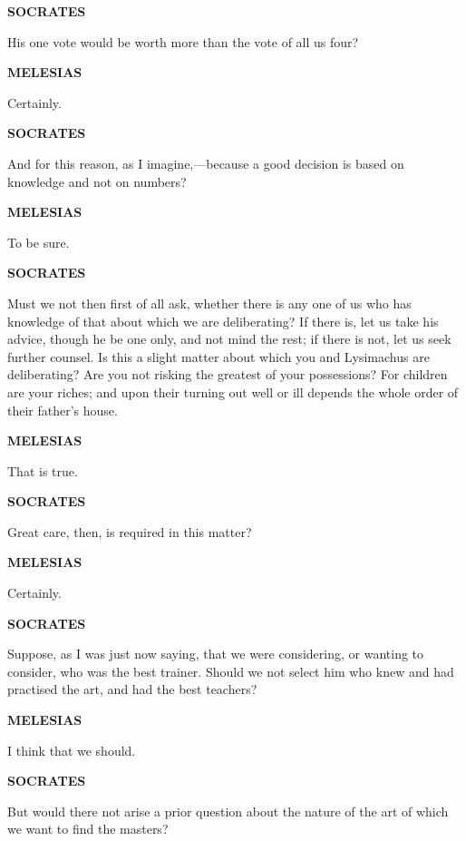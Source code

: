 \documentclass[11pt,letter]{book}
\begin{document}
\par \textbf{SOCRATES}
\par   His one vote would be worth more than the vote of all us four?

\par \textbf{MELESIAS}
\par   Certainly.

\par \textbf{SOCRATES}
\par   And for this reason, as I imagine,—because a good decision is based on knowledge and not on numbers?

\par \textbf{MELESIAS}
\par   To be sure.

\par \textbf{SOCRATES}
\par   Must we not then first of all ask, whether there is any one of us who has knowledge of that about which we are deliberating? If there is, let us take his advice, though he be one only, and not mind the rest; if there is not, let us seek further counsel. Is this a slight matter about which you and Lysimachus are deliberating? Are you not risking the greatest of your possessions? For children are your riches; and upon their turning out well or ill depends the whole order of their father's house.

\par \textbf{MELESIAS}
\par   That is true.

\par \textbf{SOCRATES}
\par   Great care, then, is required in this matter?

\par \textbf{MELESIAS}
\par   Certainly.

\par \textbf{SOCRATES}
\par   Suppose, as I was just now saying, that we were considering, or wanting to consider, who was the best trainer. Should we not select him who knew and had practised the art, and had the best teachers?

\par \textbf{MELESIAS}
\par   I think that we should.

\par \textbf{SOCRATES}
\par   But would there not arise a prior question about the nature of the art of which we want to find the masters?
\end{document}
